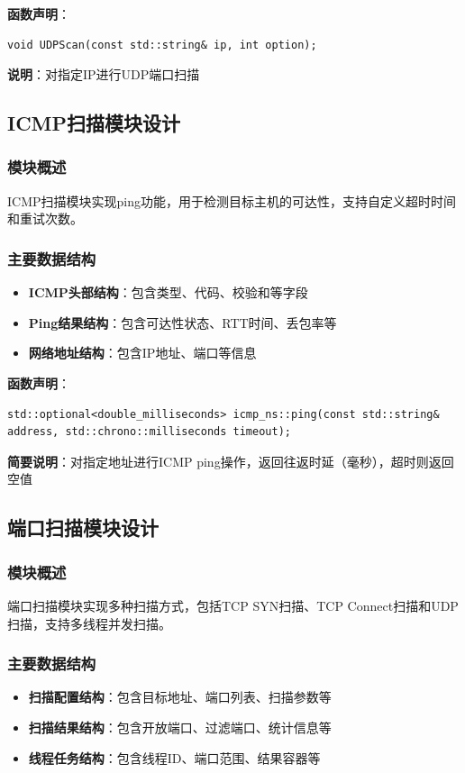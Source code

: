 \documentclass[12pt,hyperref,a4paper,UTF8]{ctexart}
\begin{document}
\textbf{函数声明}：
\begin{verbatim}
void UDPScan(const std::string& ip, int option);
\end{verbatim}
\textbf{说明}：对指定IP进行UDP端口扫描

\subsection{ICMP扫描模块设计}

\subsubsection{模块概述}
ICMP扫描模块实现ping功能，用于检测目标主机的可达性，支持自定义超时时间和重试次数。

\subsubsection{主要数据结构}
\begin{itemize}
    \item \textbf{ICMP头部结构}：包含类型、代码、校验和等字段
    \item \textbf{Ping结果结构}：包含可达性状态、RTT时间、丢包率等
    \item \textbf{网络地址结构}：包含IP地址、端口等信息
\end{itemize}


\textbf{函数声明}：
\begin{verbatim}
std::optional<double_milliseconds> icmp_ns::ping(const std::string& address, std::chrono::milliseconds timeout);
\end{verbatim}
\textbf{简要说明}：对指定地址进行ICMP ping操作，返回往返时延（毫秒），超时则返回空值

\subsection{端口扫描模块设计}

\subsubsection{模块概述}
端口扫描模块实现多种扫描方式，包括TCP SYN扫描、TCP Connect扫描和UDP扫描，支持多线程并发扫描。

\subsubsection{主要数据结构}
\begin{itemize}
    \item \textbf{扫描配置结构}：包含目标地址、端口列表、扫描参数等
    \item \textbf{扫描结果结构}：包含开放端口、过滤端口、统计信息等
    \item \textbf{线程任务结构}：包含线程ID、端口范围、结果容器等
\end{itemize}
\end{document}
